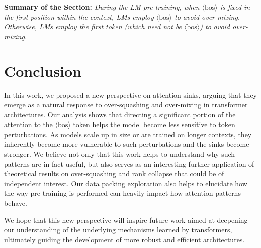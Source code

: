 \documentclass{article} %
\newcommand{\bos}{\ensuremath{\langle\text{bos}\rangle}\xspace}
\begin{document}



\begin{tcolorbox}[boxsep=0mm,left=2.5mm,right=2.5mm]
\textbf{Summary of the Section:} {\em During the LM pre-training, when \bos is fixed in the first position within the context, LMs employ \bos to avoid over-mixing. Otherwise, LMs employ the first token (which need not be \bos) to avoid over-mixing. }   
\end{tcolorbox}


\section{Conclusion}
In this work, we proposed a new perspective on attention sinks, arguing that they emerge as a natural response to over-squashing and over-mixing in transformer architectures. Our analysis shows that directing a significant portion of the attention to the \bos token helps the model become less sensitive to token perturbations. As models scale up in size or are trained on longer contexts, they inherently become more vulnerable to such perturbations and the sinks become stronger. We believe not only that this work helps to understand why such patterns are in fact useful, but also serves as an interesting further application of theoretical results on over-squashing and rank collapse that could be of independent interest. Our data packing exploration also helps to elucidate how the way pre-training is performed can heavily impact how attention patterns behave.

We hope that this new perspective will inspire future work aimed at deepening our understanding of the underlying mechanisms learned by transformers, ultimately guiding the development of more robust and efficient architectures.



\end{document}
